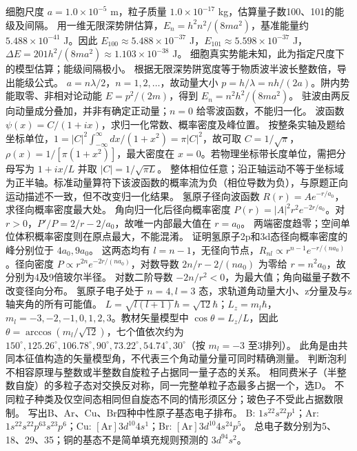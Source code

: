 \problemtext 细胞尺度 $a=1.0\times10^{-5}$ m，粒子质量 $1.0\times10^{-17}$ kg，估算量子数100、101的能级及间隔。
\workings 用一维无限深势阱估算，$E_n=h^2n^2/(8ma^2)$，基准能量约 $5.488\times10^{-41}$ J。因此 $E_{100}\approx5.488\times10^{-37}$ J，$E_{101}\approx5.598\times10^{-37}$ J，$\Delta E=201h^2/(8ma^2)\approx1.103\times10^{-38}$ J。
\crosscheck 细胞真实势能未知，此为指定尺度下的模型估算；能级间隔极小。
\problemtext 根据无限深势阱宽度等于物质波半波长整数倍，导出能级公式。
\workings $a=n\lambda/2$，$n=1,2,\ldots$，故动量大小 $p=h/\lambda=nh/(2a)$。阱内势能取零、非相对论动能 $E=p^2/(2m)$，得到 $E_n=n^2h^2/(8ma^2)$。
\crosscheck 驻波由两反向动量成分叠加，并非有确定正动量；$n=0$ 给零波函数，不能归一化。
\problemtext 波函数 $\psi(x)=C/(1+ix)$，求归一化常数、概率密度及峰位置。
\workings 按整条实轴及题给坐标单位，$1=|C|^2\int_{-\infty}^{\infty}dx/(1+x^2)=\pi|C|^2$，故可取 $C=1/\sqrt\pi$，$\rho(x)=1/[\pi(1+x^2)]$，最大密度在 $x=0$。若物理坐标带长度单位，需把分母写为 $1+ix/L$ 并取 $|C|=1/\sqrt{\pi L}$。
\crosscheck 整体相位任意；沿正轴运动不等于坐标域为正半轴。标准动量算符下该波函数的概率流为负（相位导数为负），与原题正向运动描述不一致，但不改变归一化结果。
\problemtext 氢原子径向波函数 $R(r)=Ae^{-r/a_0}$，求径向概率密度最大处。
\workings 角向归一化后径向概率密度 $P(r)=|A|^2r^2e^{-2r/a_0}$。对 $r>0$，$P'/P=2/r-2/a_0$，故唯一内部最大值在 $r=a_0$。
\crosscheck 两端密度趋零；空间单位体积概率密度则在原点最大，不能混淆。
\problemtext 证明氢原子2p和3d态径向概率密度的峰分别位于 $4a_0,9a_0$。
\workings 这两态均有 $l=n-1$，无径向节点，$R_{nl}\propto r^{n-1}e^{-r/(na_0)}$。径向密度 $P\propto r^{2n}e^{-2r/(na_0)}$，对数导数 $2n/r-2/(na_0)$ 为零给 $r=n^2a_0$，故分别为4及9倍玻尔半径。
\crosscheck 对数二阶导数 $-2n/r^2<0$，为最大值；角向磁量子数不改变径向分布。
\problemtext 氢原子电子处于 $n=4,l=3$ 态，求轨道角动量大小、z分量及与z轴夹角的所有可能值。
\workings $L=\sqrt{l(l+1)}\hbar=\sqrt{12}\hbar$；$L_z=m_l\hbar$，$m_l=-3,-2,-1,0,1,2,3$。教材矢量模型中 $\cos\theta=L_z/L$，因此 $\theta=\arccos(m_l/\sqrt{12})$，七个值依次约为 $150^\circ,125.26^\circ,106.78^\circ,90^\circ,73.22^\circ,54.74^\circ,30^\circ$（按 $m_l=-3$ 至3排列）。
\crosscheck 此角是由共同本征值构造的矢量模型角，不代表三个角动量分量可同时精确测量。
\problemtext 判断泡利不相容原理与整数或半整数自旋粒子占据同一量子态的关系。
\workings 相同费米子（半整数自旋）的多粒子态对交换反对称，同一完整单粒子态最多占据一个，选D。
\crosscheck 不同粒子种类及仅空间态相同但自旋态不同的情形须区分；玻色子不受此占据数限制。
\problemtext 写出B、Ar、Cu、Br四种中性原子基态电子排布。
\workings B: $1s^22s^22p^1$；Ar: $1s^22s^22p^63s^23p^6$；Cu: $[\mathrm{Ar}]3d^{10}4s^1$；Br: $[\mathrm{Ar}]3d^{10}4s^24p^5$。
\crosscheck 总电子数分别为5、18、29、35；铜的基态不是简单填充规则预测的 $3d^94s^2$。
